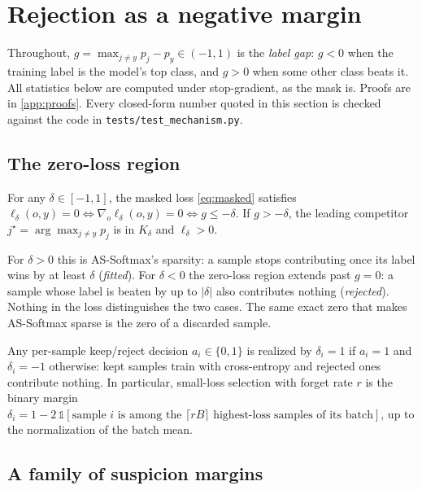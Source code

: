 \section{Rejection as a negative margin}
\label{sec:theory}

Throughout, $g = \max_{j \ne y} p_j - p_y \in (-1, 1)$ is the \emph{label gap}: $g < 0$ when
the training label is the model's top class, and $g > 0$ when some other class beats it. All
statistics below are computed under stop-gradient, as the mask is. Proofs are in
\cref{app:proofs}. Every closed-form number quoted in this section is checked against the code in
\texttt{tests/test\_mechanism.py}.

\subsection{The zero-loss region}

\begin{proposition}
\label{prop:zero}
For any $\delta \in [-1, 1]$, the masked loss \eqref{eq:masked} satisfies
$\ell_\delta(o, y) = 0 \iff \nabla_o \ell_\delta(o, y) = 0 \iff g \le -\delta$.
If $g > -\delta$, the leading competitor $j^\star = \arg\max_{j\ne y} p_j$ is in $K_\delta$ and
$\ell_\delta > 0$.
\end{proposition}

For $\delta > 0$ this is AS-Softmax's sparsity: a sample stops contributing once its label wins by
at least $\delta$ (\emph{fitted}). For $\delta < 0$ the zero-loss region extends past $g = 0$: a
sample whose label is beaten by up to $|\delta|$ also contributes nothing (\emph{rejected}).
Nothing in the loss distinguishes the two cases. The same exact zero that makes AS-Softmax sparse
is the zero of a discarded sample.

\begin{corollary}
\label{cor:selection}
Any per-sample keep/reject decision $a_i \in \{0, 1\}$ is realized by $\delta_i = 1$ if $a_i = 1$
and $\delta_i = -1$ otherwise: kept samples train with cross-entropy and rejected ones contribute
nothing. In particular, small-loss selection with forget rate $r$ is the binary margin
$\delta_i = 1 - 2\,\mathbb{1}[\text{sample $i$ is among the $\lceil rB \rceil$ highest-loss samples of
its batch}]$, up to the normalization of the batch mean.
\end{corollary}

\subsection{A family of suspicion margins}


